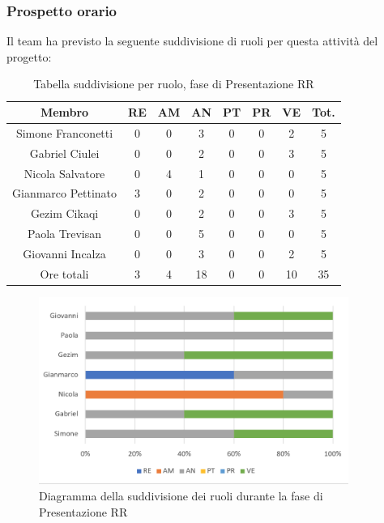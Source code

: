 \subsubsection{Prospetto orario}
Il team ha previsto la seguente suddivisione di ruoli per questa attività del progetto:
\begin{table}[h]
\caption{Tabella suddivisione per ruolo, fase di Presentazione RR}  
\begin{center}
\begin{tabular}{ |c|c|c|c|c|c|c|c|  }
 \hline
 Membro 		& RE 	& AM 	& AN 	& PT 	& PR 	& VE 	& Tot.\\
 \hline\hline
 Simone	Franconetti		& 0 		& 0		& 3 	& 0 		& 0 		& 2 		& 5\\
 Gabriel Ciulei	& 0 		& 0 		& 2 	& 0 		& 0 		& 3 		& 5\\
 Nicola	Salvatore		& 0 		& 4 		& 1 	& 0 		& 0 		& 0 		& 5\\
 Gianmarco	Pettinato	& 3 		& 0 		& 2 	& 0 		& 0 		& 0 		& 5\\
 Gezim	Cikaqi		& 0 		& 0 		& 2 	& 0 		& 0 		& 3	 	& 5\\
 Paola	Trevisan		& 0 		& 0 		& 5 	& 0 		& 0 		& 0 		& 5\\
 Giovanni	Incalza	& 0 		& 0	 	& 3 	& 0 		& 0 		& 2  	& 5\\
 \hline\hline
 Ore totali		& 3		& 4		& 18 	& 0	 	& 0 		& 10 		& 35\\
  \hline
\end{tabular}
\end{center}
\end{table}
\begin{figure}[h!]
	\includegraphics[width=0.9\textwidth]{res/img/hi2}
	\caption{Diagramma della suddivisione dei ruoli durante la fase di Presentazione RR}
\end{figure}
\newpage
